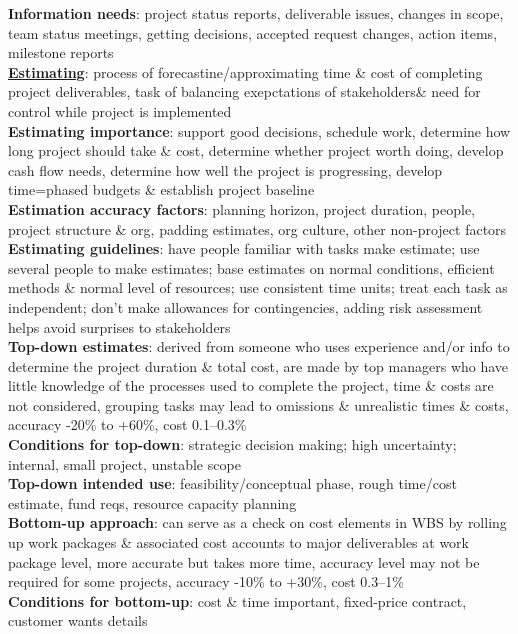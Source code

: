 \documentclass[a4paper]{article}
\begin{document}
\begin{multicols}{2}
        \textbf{Information needs}: project status reports, deliverable issues, changes in scope, team status meetings, getting decisions, accepted request changes, action items, milestone reports\\
        \underline{\textbf{Estimating}}: process of forecastine/approximating time \& cost of completing project deliverables, task of balancing exepctations of stakeholders\& need for control while project is implemented\\
        \textbf{Estimating importance}: support good decisions, schedule work, determine how long project should take \& cost, determine whether project worth doing, develop cash flow needs, determine how well the project is progressing, develop time=phased budgets \& establish project baseline\\
        \textbf{Estimation accuracy factors}: planning horizon, project duration, people, project structure \& org, padding estimates, org culture, other non-project factors\\
        \textbf{Estimating guidelines}: have people familiar with tasks make estimate; use several people to make estimates; base estimates on normal conditions, efficient methods \& normal level of resources; use consistent time units; treat each task as independent; don't make allowances for contingencies, adding risk assessment helps avoid surprises to stakeholders\\
        \textbf{Top-down estimates}: derived from someone who uses experience and/or info to determine the project duration \& total cost, are made by top managers who have little knowledge of the processes used to complete the project, time \& costs are not considered, grouping tasks may lead to omissions \& unrealistic times \& costs, accuracy -20\% to +60\%, cost 0.1--0.3\%\\
        \textbf{Conditions for top-down}: strategic decision making; high uncertainty; internal, small project, unstable scope\\
        \textbf{Top-down intended use}: feasibility/conceptual phase, rough time/cost estimate, fund reqs, resource capacity planning\\
        \textbf{Bottom-up approach}: can serve as a check on cost elements in WBS by rolling up work packages \& associated cost accounts to major deliverables at work package level, more accurate but takes more time, accuracy level may not be required for some projects, accuracy -10\% to +30\%, cost 0.3--1\%\\
        \textbf{Conditions for bottom-up}: cost \& time important, fixed-price contract, customer wants details\\

\end{multicols}
\end{document}
